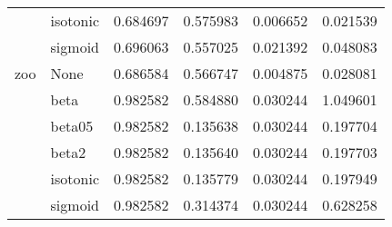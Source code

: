 \begin{tabular}{llrrrr}
        & isotonic &  0.684697 &   0.575983 &  0.006652 &  0.021539 \\
        & sigmoid &  0.696063 &   0.557025 &  0.021392 &  0.048083 \\
zoo & None &  0.686584 &   0.566747 &  0.004875 &  0.028081 \\
        & beta &  0.982582 &   0.584880 &  0.030244 &  1.049601 \\
        & beta05 &  0.982582 &   0.135638 &  0.030244 &  0.197704 \\
        & beta2 &  0.982582 &   0.135640 &  0.030244 &  0.197703 \\
        & isotonic &  0.982582 &   0.135779 &  0.030244 &  0.197949 \\
        & sigmoid &  0.982582 &   0.314374 &  0.030244 &  0.628258 \\
\bottomrule
\end{tabular}
